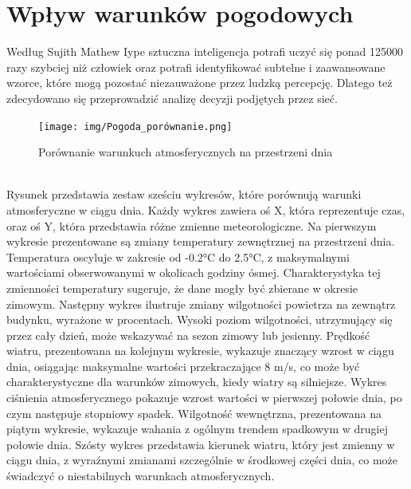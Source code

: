 \documentclass[a4paper,twoside,12pt]{book}
\begin{document}
\chapter{Wpływ warunków pogodowych}
\label{ch:pogoda}

Według Sujith Mathew Iype\cite{bib:AI_FAST} sztuczna inteligencja potrafi uczyć się ponad 125000 razy szybciej niż człowiek oraz potrafi identyfikować subtelne i zaawansowane wzorce, które mogą pozostać niezauważone przez ludzką percepcję. Dlatego też zdecydowano się przeprowadzić analizę decyzji podjętych przez sieć.\\
\begin{figure}[!h]
  \centering
  \texttt{[image: img/Pogoda\_porównanie.png]}
  \caption{Porównanie warunkuch atmosferycznych na przestrzeni dnia}
  \label{fig:etykieta-rysunku}
\end{figure}\\
Rysunek przedstawia zestaw sześciu wykresów, które porównują warunki atmosferyczne w ciągu dnia. Każdy wykres zawiera oś X, która reprezentuje czas, oraz oś Y, która przedstawia różne zmienne meteorologiczne. Na pierwszym wykresie prezentowane są zmiany temperatury zewnętrznej na przestrzeni dnia. Temperatura oscyluje w zakresie od -0.2°C do 2.5°C, z maksymalnymi wartościami obserwowanymi w okolicach godziny ósmej. Charakterystyka tej zmienności temperatury sugeruje, że dane mogły być zbierane w okresie zimowym. Następny wykres ilustruje zmiany wilgotności powietrza na zewnątrz budynku, wyrażone w procentach. Wysoki poziom wilgotności, utrzymujący się przez cały dzień, może wskazywać na sezon zimowy lub jesienny. Prędkość wiatru, prezentowana na kolejnym wykresie, wykazuje znaczący wzrost w ciągu dnia, osiągając maksymalne wartości przekraczające 8  m/s, co może być charakterystyczne dla warunków zimowych, kiedy wiatry są silniejsze. Wykres ciśnienia atmosferycznego pokazuje wzrost wartości w pierwszej połowie dnia, po czym następuje stopniowy spadek. Wilgotność wewnętrzna, prezentowana na piątym wykresie, wykazuje wahania z ogólnym trendem spadkowym w drugiej połowie dnia. Szósty wykres przedstawia kierunek wiatru, który jest zmienny w ciągu dnia, z wyraźnymi zmianami szczególnie w środkowej części dnia, co może świadczyć o niestabilnych warunkach atmosferycznych.\\
\end{document}
